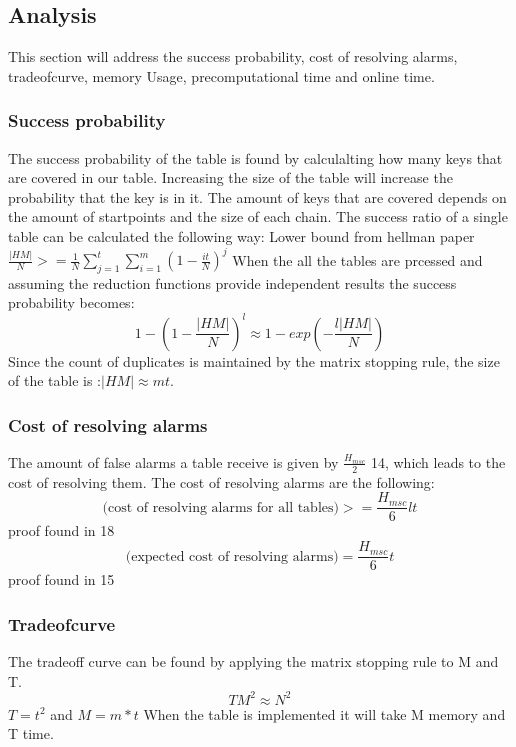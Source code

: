 \subsection*{Analysis}
This section will address the success probability, cost of resolving alarms, tradeofcurve, memory Usage, precomputational time and online time.


\subsubsection*{Success probability}
The success probability of the table is found by calculalting how many keys that are covered in our table. Increasing the size of the table will increase the probability that the key is in it. The amount of keys that are covered depends on the amount of startpoints and the size of each chain. The success ratio of a single table can be calculated the following way:
Lower bound from hellman paper
$\frac{|HM|}{N}>=\frac{1}{N}\sum^{t}_{j=1}\sum^{m}_{i=1}(1-\frac{it}{N})^{j} $
When the all the tables are prcessed and assuming the reduction functions provide independent results the success probability becomes:
\[1-(1-\frac{|HM|}{N})^l\approx 1- exp(-\frac{l|HM|}{N})\]
Since the count of duplicates is maintained by the matrix stopping rule, the size of the table is :$|HM|\approx mt$.
\subsubsection{Cost of resolving alarms}
The amount of false alarms a table receive is given by $\frac{H_{msc}}{2}$\cite{176} 14, which leads to the cost of resolving them. The cost of resolving alarms are the following:
\begin{equation}
\text{(cost of resolving alarms for all tables)}>=\frac{H_{msc}}{6}lt
\end{equation}
proof found in \cite{176} 18
\begin{equation}
\text{(expected cost of resolving alarms)}=\frac{H_{msc}}{6}t
\end{equation}
proof found in \cite{176} 15
\subsubsection{Tradeofcurve}
The tradeoff curve can be found by applying the matrix stopping rule to M and T.
\begin{equation}
TM^2\approx N^2
\end{equation}
$T=t^2$ and $M=m*t$ When the table is implemented it will take M memory and T time.

